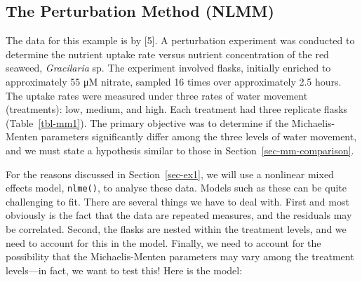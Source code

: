 \documentclass[
  letterpaper,
]{book}
\begin{document}
\subsection{The Perturbation Method (NLMM)}\label{sec-perturbation}

The data for this example is by {[}5{]}. A perturbation experiment was
conducted to determine the nutrient uptake rate versus nutrient
concentration of the red seaweed, \emph{Gracilaria} sp. The experiment
involved flasks, initially enriched to approximately 55 μM nitrate,
sampled 16 times over approximately 2.5 hours. The uptake rates were
measured under three rates of water movement (treatments): low, medium,
and high. Each treatment had three replicate flasks
(Table~\ref{tbl-mm1}). The primary objective was to determine if the
Michaelis-Menten parameters significantly differ among the three levels
of water movement, and we must state a hypothesis similar to those in
Section~\ref{sec-mm-comparison}.

\begin{table}

\caption{\label{tbl-mm1}Simulated data for a multiple flask experiment
on an alga (showing only the top and bottom three rows).}


\end{table}%

For the reasons discussed in Section~\ref{sec-ex1}, we will use a
nonlinear mixed effects model, \texttt{nlme()}, to analyse these data.
Models such as these can be quite challenging to fit. There are several
things we have to deal with. First and most obviously is the fact that
the data are repeated measures, and the residuals may be correlated.
Second, the flasks are nested within the treatment levels, and we need
to account for this in the model. Finally, we need to account for the
possibility that the Michaelis-Menten parameters may vary among the
treatment levels---in fact, we want to test this! Here is the model:
\end{document}
